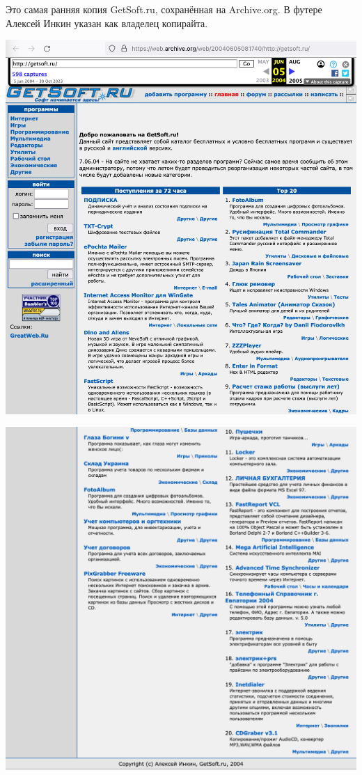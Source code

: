 
Это самая ранняя копия GetSoft.ru, сохранённая на Archive.org.
В футере Алексей Инкин указан как владелец копирайта.



\begin{center}
    \includegraphics[width=\textwidth]{getsoft-p1}
\end{center}
\WillContinue
\pagebreak

\Continuing
\begin{center}
    \includegraphics[width=\textwidth]{getsoft-p2}
\end{center}

\pagebreak
